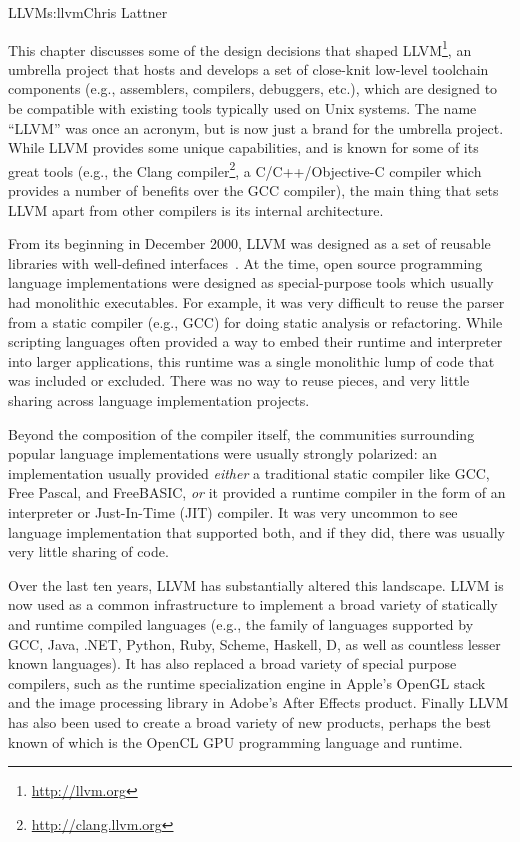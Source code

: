 \begin{aosachapter}{LLVM}{s:llvm}{Chris Lattner}

This chapter discusses some of the design decisions that shaped
LLVM\footnote{\url{http://llvm.org}}, an umbrella project that hosts
and develops a set of close-knit low-level toolchain components (e.g.,
assemblers, compilers, debuggers, etc.), which are designed to be
compatible with existing tools typically used on Unix systems.  The
name ``LLVM'' was once an acronym, but is now just a brand for the
umbrella project.  While LLVM provides some unique capabilities, and
is known for some of its great tools (e.g., the Clang
compiler\footnote{\url{http://clang.llvm.org}}, a C/C++/Objective-C
compiler which provides a number of benefits over the GCC compiler),
the main thing that sets LLVM apart from other compilers is its
internal architecture.

From its beginning in December 2000, LLVM was designed as a set of
reusable libraries with well-defined
interfaces~\cite{bib:lattner:cgo}.  At the time, open source
programming language implementations were designed as special-purpose
tools which usually had monolithic executables. For example, it was
very difficult to reuse the parser from a static compiler (e.g., GCC)
for doing static analysis or refactoring.  While scripting languages
often provided a way to embed their runtime and interpreter into
larger applications, this runtime was a single monolithic lump of code
that was included or excluded.  There was no way to reuse pieces, and
very little sharing across language implementation projects.

Beyond the composition of the compiler itself, the communities
surrounding popular language implementations were usually strongly
polarized: an implementation usually provided \emph{either} a
traditional static compiler like GCC, Free Pascal, and FreeBASIC,
\emph{or} it provided a runtime compiler in the form of an
interpreter or Just-In-Time (JIT) compiler.  It was very uncommon to
see language implementation that supported both, and if they did,
there was usually very little sharing of code.

Over the last ten years, LLVM has substantially altered this
landscape.  LLVM is now used as a common infrastructure to implement a
broad variety of statically and runtime compiled languages (e.g., the
family of languages supported by GCC, Java, .NET, Python, Ruby,
Scheme, Haskell, D, as well as countless lesser known languages).  It
has also replaced a broad variety of special purpose compilers, such
as the runtime specialization engine in Apple's OpenGL stack and the
image processing library in Adobe's After Effects product.  Finally
LLVM has also been used to create a broad variety of new products,
perhaps the best known of which is the OpenCL GPU programming language
and runtime.


\end{aosachapter}
